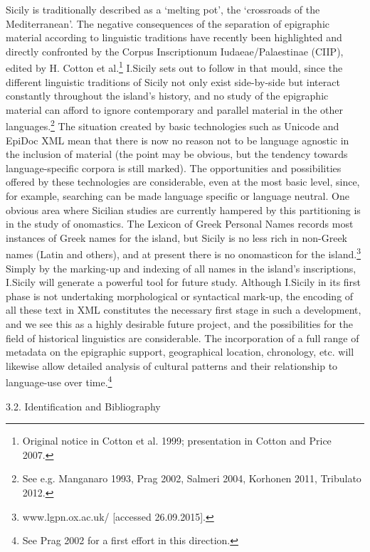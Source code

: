 \documentclass[amsthm,ebook]{saparticle}
\begin{document}
Sicily is traditionally described as a ‘melting pot’, the ‘crossroads of the Mediterranean’. The negative consequences
of the separation of epigraphic material according to linguistic traditions have recently been highlighted and directly
confronted by the Corpus Inscriptionum Iudaeae/Palaestinae (CIIP), edited by H. Cotton et al.\footnote{ Original notice
in Cotton et al. 1999; presentation in Cotton and Price 2007.} I.Sicily sets out to follow in that mould, since the
different linguistic traditions of Sicily not only exist side-by-side but interact constantly throughout the island’s
history, and no study of the epigraphic material can afford to ignore contemporary and parallel material in the other
languages.\footnote{ See e.g. Manganaro 1993, Prag 2002, Salmeri 2004, Korhonen 2011, Tribulato 2012.} The situation
created by basic technologies such as Unicode and EpiDoc XML mean that there is now no reason not to be language
agnostic in the inclusion of material (the point may be obvious, but the tendency towards language-specific corpora is
still marked). The opportunities and possibilities offered by these technologies are considerable, even at the most
basic level, since, for example, searching can be made language specific or language neutral. One obvious area where
Sicilian studies are currently hampered by this partitioning is in the study of onomastics. The Lexicon of Greek
Personal Names records most instances of Greek names for the island, but Sicily is no less rich in non-Greek names
(Latin and others), and at present there is no onomasticon for the island.\footnote{ www.lgpn.ox.ac.uk/ [accessed
26.09.2015].} Simply by the marking-up and indexing of all names in the island’s inscriptions, I.Sicily will generate a
powerful tool for future study. Although I.Sicily in its first phase is not undertaking morphological or syntactical
mark-up, the encoding of all these text in XML constitutes the necessary first stage in such a development, and we see
this as a highly desirable future project, and the possibilities for the field of historical linguistics are
considerable. The incorporation of a full range of metadata on the epigraphic support, geographical location,
chronology, etc. will likewise allow detailed analysis of cultural patterns and their relationship to language-use over
time.\footnote{ See Prag 2002 for a first effort in this direction.}


\bigskip

3.2. Identification and Bibliography
\end{document}
